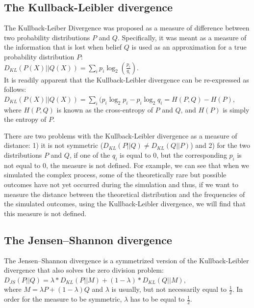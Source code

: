 \subsection{The Kullback-Leibler divergence}

The Kullback-Leiber Divergence was proposed as a measure of difference between two probability distributions $P$ and $Q$. Specifically, it was meant as a measure of the information that is lost when belief $Q$ is used as an approximation for a true probability distribution $P$:
\\

$D_{KL}(P(X) | | Q(X))=\sum_ip_i\log_2(\frac{p_i}{q_i}).$
\\

It is readily apparent that the Kullback-Leibler divergence can be re-expressed as follows:
\\

$D_{KL}(P(X) | | Q(X))=\sum_i (p_i\log_2p_i -p_i\log_2q_i = H(P, Q)-H(P)$, 
\\

where $H(P, Q)$ is known as the cross-entropy of $P$ and $Q$, and $H(P)$ is simply the entropy of $P$.

There are two problems with the Kullback-Leibler divergence as a measure of distance: 1) it is not symmetric ($D_{KL}(P | | Q) \not= D_{KL}(Q | | P)$) and 2) for the two distributions $P$ and $Q$, if one of the $q_i$ is equal to $0$, but the corresponding $p_i$ is not equal to $0$, the measure is not defined.  For example, we can see that when we simulated the complex process, some of the theoretically rare but possible outcomes have not yet occurred during the simulation and thus, if we want to measure the distance between the theoretical distribution and the frequencies of the simulated outcomes, using the Kullback-Leibler divergence, we will find that this measure is not defined. 

\subsection{The Jensen–Shannon divergence}

The Jensen–Shannon divergence is a symmetrized version of the Kullback-Leibler divergence that also solves the zero division problem:
\\

$D_{JS}(P | | Q)=\lambda*D_{KL}(P | | M) + (1-\lambda)*D_{KL}(Q | |M),$ 
\\

where $M=\lambda P + (1-\lambda) Q$ and $\lambda$ is usually, but not necessarily equal to $\frac{1}{2}$. In order for the measure to be symmetric, $\lambda$ has to be equal to $\frac{1}{2}$. 


